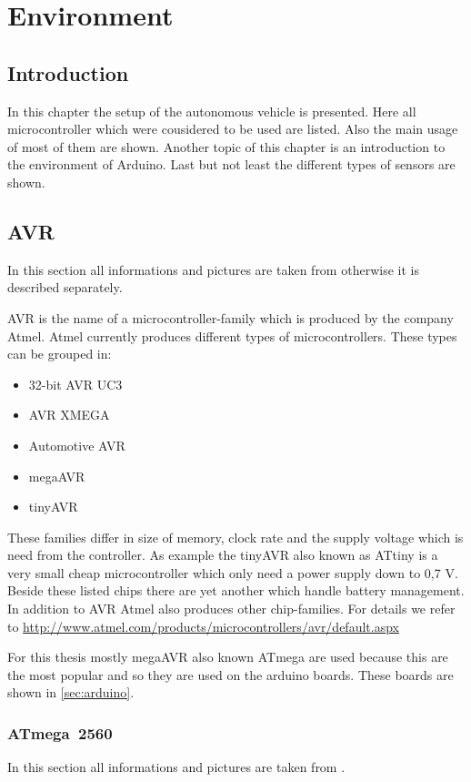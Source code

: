 \chapter{Environment} \label{chap:environment}
\section{Introduction} \label{sec:introduction}
In this chapter the setup of the autonomous vehicle is presented. 
Here all microcontroller which were cousidered to be used are listed.
Also the main usage of most of them are shown.
Another topic of this chapter is an introduction to the environment of Arduino.
Last but not least the different types of sensors are shown.

\section{AVR} \label{sec:AVR}
In this section all informations and pictures are taken from \cite{web:Atmel} otherwise it is described separately.

AVR is the name of a microcontroller-family which is produced by the company Atmel.
Atmel currently produces different types of microcontrollers.
These types can be grouped in:

\begin{itemize}
\item 32-bit AVR UC3
\item AVR XMEGA
\item Automotive AVR
\item megaAVR
\item tinyAVR
\end{itemize}

These families differ in size of memory, clock rate and the supply voltage which is need from the controller.
As example the tinyAVR also known as ATtiny is a very small cheap microcontroller which only need a power supply down to 0,7 V.
Beside these listed chips there are yet another which handle battery management.
In addition to AVR Atmel also produces other chip-families.
For details we refer to \url{ http://www.atmel.com/products/microcontrollers/avr/default.aspx }

For this thesis mostly megaAVR also known ATmega are used because this are the most popular and so they are used on the arduino boards.
These boards are shown in \ref{sec:arduino}.

\subsection{ATmega~2560} \label{sec:atmega2560}
In this section all informations and pictures are taken from \cite{manual:atmega2560}.

